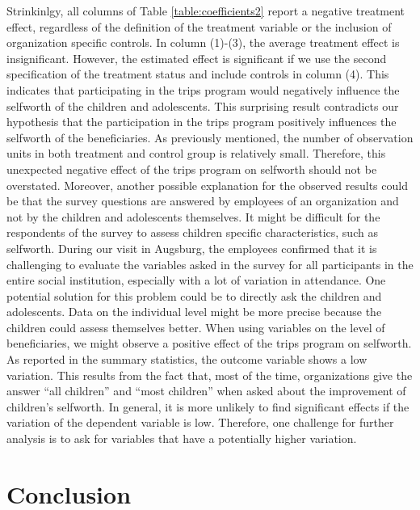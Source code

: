 \documentclass[12pt, a4paper, titlepage]{article}\usepackage[]{graphicx}\usepackage[]{color}
\begin{document}
Strinkinlgy, all columns of Table \ref{table:coefficients2} report a negative treatment effect, regardless of the definition of the treatment variable or the inclusion of organization specific controls. In column (1)-(3), the average treatment effect is insignificant. However, the estimated effect is significant if we use the second specification of the treatment status and include controls in column (4). This indicates that participating in the trips program would negatively influence the selfworth of the children and adolescents. This surprising result contradicts our hypothesis that the participation in the trips program positively influences the selfworth of the beneficiaries. As previously mentioned, the number of observation units in both treatment and control group is relatively small. Therefore, this unexpected negative effect of the trips program on selfworth should not be overstated. Moreover, another possible explanation for the observed results could be that the survey questions are answered by employees of an organization and not by the children and adolescents themselves. It might be difficult for the respondents of the survey to assess children specific characteristics, such as selfworth. During our visit in Augsburg, the employees confirmed that it is challenging to evaluate the variables asked in the survey for all participants in the entire social institution, especially with a lot of variation in attendance. One potential solution for this problem could be to directly ask the children and adolescents. Data on the individual level might be more precise because the children could assess themselves better. When using variables on the level of beneficiaries, we might observe a positive effect of the trips program on selfworth.
As reported in the summary statistics, the outcome variable shows a low variation. This results from the fact that, most of the time, organizations give the answer “all children” and “most children” when asked about the improvement of children’s selfworth. In general, it is more unlikely to find significant effects if the variation of the dependent variable is low. Therefore, one challenge for further analysis is to ask for variables that have a potentially higher variation.

\section{Conclusion}
\end{document}
